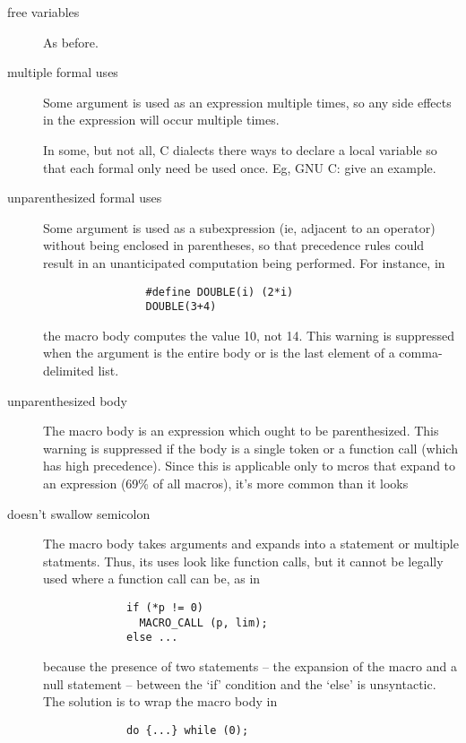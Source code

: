 
\begin{description}
\item[free variables]
  As before.

\item[multiple formal uses]
        Some argument is used as an expression multiple times, so any side
        effects in the expression will occur multiple times.

        In some, but not all, C dialects there ways to declare a local
          variable so that each formal only need be used once.  Eg, GNU C:
          give an example.


\item[unparenthesized formal uses]
        Some argument is used as a subexpression (ie, adjacent to an
        operator) without being enclosed in parentheses, so that precedence
        rules could result in an unanticipated computation being performed.
        For instance, in
\begin{verbatim}
                #define DOUBLE(i) (2*i)
                DOUBLE(3+4)
\end{verbatim}
        the macro body computes the value 10, not 14.
        This warning is suppressed when the argument is the entire body
        or is the last element of a comma-delimited list.

\item[unparenthesized body]
        The macro body is an expression which ought to be parenthesized.
        This warning is suppressed if the body is a single token or a
        function call (which has high precedence).  Since this is
        applicable only to mcros that expand to an expression (69\% of all
        macros), it's more common than it looks

\item[doesn't swallow semicolon]
        The macro body takes arguments and expands into a statement or
        multiple statments.  Thus, its uses look like function calls, but
        it cannot be legally used where a function call can be, as in
\begin{verbatim}
             if (*p != 0)
               MACRO_CALL (p, lim);
             else ...
\end{verbatim}
        because the presence of two statements -- the expansion of the macro and
        a null statement -- between the `if' condition and the `else'
        is unsyntactic.  The solution is to wrap the macro body in
\begin{verbatim}
             do {...} while (0);
\end{verbatim}


\end{description}
